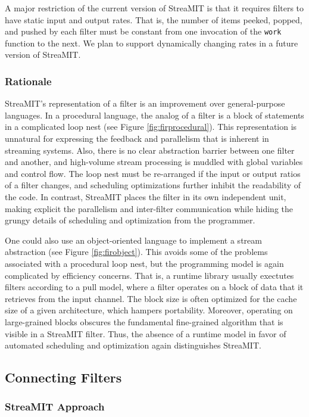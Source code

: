 A major restriction of the current version of StreaMIT is that it
requires filters to have static input and output rates.  That is, the
number of items peeked, popped, and pushed by each filter must be
constant from one invocation of the {\tt work} function to the next.
We plan to support dynamically changing rates in a future version of
StreaMIT.

\subsubsection{Rationale}

StreaMIT's representation of a filter is an improvement over
general-purpose languages.  In a procedural language, the analog of a
filter is a block of statements in a complicated loop nest (see Figure
\ref{fig:firprocedural}).  This representation is unnatural for expressing
the feedback and parallelism that is inherent in streaming systems.
Also, there is no clear abstraction barrier between one filter and
another, and high-volume stream processing is muddled with global
variables and control flow.  The loop nest must be re-arranged if the
input or output ratios of a filter changes, and scheduling
optimizations further inhibit the readability of the code.  In
contrast, StreaMIT places the filter in its own independent unit,
making explicit the parallelism and inter-filter communication while
hiding the grungy details of scheduling and optimization from the
programmer.

One could also use an object-oriented language to implement a stream
abstraction (see Figure \ref{fig:firobject}).  This avoids some of the
problems associated with a procedural loop nest, but the programming
model is again complicated by efficiency concerns.  That is, a runtime
library usually exectutes filters according to a pull model, where a
filter operates on a block of data that it retrieves from the input
channel.  The block size is often optimized for the cache size of a
given architecture, which hampers portability.  Moreover, operating on
large-grained blocks obscures the fundamental fine-grained algorithm
that is visible in a StreaMIT filter.  Thus, the absence of a runtime
model in favor of automated scheduling and optimization again
distinguishes StreaMIT.

\subsection{Connecting Filters}

\subsubsection{StreaMIT Approach}

